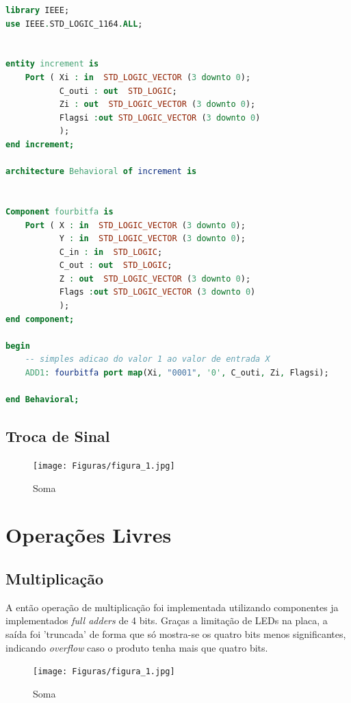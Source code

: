 \documentclass[a4paper, 12pt]{article}
\begin{document}
\begin{lstlisting}[language=VHDL]
library IEEE;
use IEEE.STD_LOGIC_1164.ALL;


entity increment is
    Port ( Xi : in  STD_LOGIC_VECTOR (3 downto 0);
           C_outi : out  STD_LOGIC;
           Zi : out  STD_LOGIC_VECTOR (3 downto 0);
           Flagsi :out STD_LOGIC_VECTOR (3 downto 0)
           );
end increment;

architecture Behavioral of increment is


Component fourbitfa is
    Port ( X : in  STD_LOGIC_VECTOR (3 downto 0);
           Y : in  STD_LOGIC_VECTOR (3 downto 0);
           C_in : in  STD_LOGIC;
           C_out : out  STD_LOGIC;
           Z : out  STD_LOGIC_VECTOR (3 downto 0);
		   Flags :out STD_LOGIC_VECTOR (3 downto 0)
		   );
end component;

begin
	-- simples adicao do valor 1 ao valor de entrada X
    ADD1: fourbitfa port map(Xi, "0001", '0', C_outi, Zi, Flagsi);

end Behavioral;
\end{lstlisting}

\subsection{Troca de Sinal}

\begin{figure}[H]
\caption{Soma}
\centering
\texttt{[image: Figuras/figura\_1.jpg]}
\label{figura:qualquernome}
\end{figure}


\section{Operações Livres}

\subsection{Multiplicação}
A então operação de multiplicação foi implementada utilizando componentes ja implementados \textit{full adders} de 4 bits. Graças a limitação de LEDs na placa, a saída foi 'truncada' de forma que só mostra-se os quatro bits menos significantes, indicando \textit{overflow} caso o produto tenha mais que quatro bits.

\begin{figure}[H]
\caption{Soma}
\centering
\texttt{[image: Figuras/figura\_1.jpg]}
\label{figura:qualquernome}
\end{figure}
\end{document}
